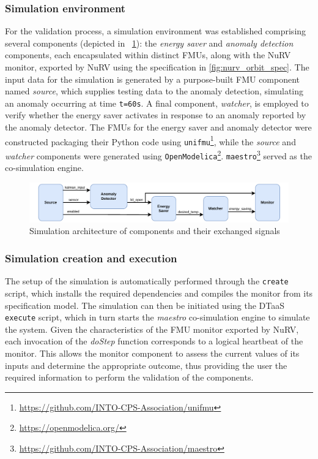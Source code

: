 \subsubsection{Simulation environment}
For the validation process, a simulation environment was established
comprising several components (depicted in ~\cref{fig:nurv_fmi_simulation}): the \textit{energy saver} and \textit{anomaly detection} components, each encapsulated within distinct FMUs, along with the NuRV monitor, exported by NuRV using the specification in \cref{fig:nurv_orbit_spec}. The input data for the simulation is generated by a purpose-built FMU component named \textit{source}, which supplies testing data to the anomaly detection, simulating an anomaly occurring at time \texttt{t=60s}. A final component, \textit{watcher}, is employed to verify whether the energy saver activates in response to an anomaly reported by the anomaly detector. The FMUs for the energy saver and anomaly detector were constructed packaging their Python code using \lstinline{unifmu}\footnote{\url{https://github.com/INTO-CPS-Association/unifmu}}, while the \textit{source} and \textit{watcher} components were generated using \lstinline{OpenModelica}\footnote{\url{https://openmodelica.org/}}. \lstinline{maestro}\footnote{\url{https://github.com/INTO-CPS-Association/maestro}} served as the co-simulation engine.%
%
\begin{figure}[ht]
	\centering
	\includegraphics[width=\columnwidth]{images/FMI-communication.pdf}
	\caption{Simulation architecture of components and their exchanged signals}
	\label{fig:nurv_fmi_simulation}
\end{figure}%
%
\subsubsection{Simulation creation and execution}
The setup of the simulation is automatically performed through the \texttt{create} script, which installs the required dependencies and compiles the monitor from its specification model. The simulation can then be initiated using the DTaaS \texttt{execute} script, which in turn starts the \textit{maestro} co-simulation engine to simulate the system. Given the characteristics of the FMU monitor exported by NuRV, each invocation of the \textit{doStep} function corresponds to a logical heartbeat of the monitor. This allows the monitor component to assess the current values of its inputs and determine the appropriate outcome, thus providing the user the required information to perform the validation of the components.



